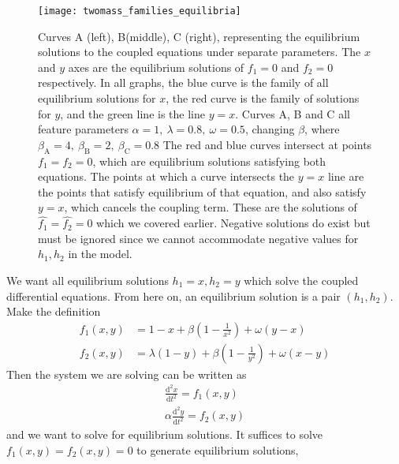 \documentclass{article}
\begin{document}
\begin{figure}
    \centering
    \texttt{[image: twomass\_families\_equilibria]}
    \caption{
        Curves A (left), B(middle), C (right), representing the equilibrium solutions to the coupled equations under separate parameters.
        The $x$ and $y$ axes are the equilibrium solutions of $f_1 = 0$ and $f_2=0$ respectively. 
        In all graphs, the blue curve is the family of all equilibrium solutions for $x$,
        the red curve is the family of solutions for $y$,
        and the green line is the line $y=x$.
        Curves A, B and C all feature parameters \(\alpha = 1,~\lambda=0.8,~\omega = 0.5\), changing $\beta$,
        where \(\beta_\mathrm{A} = 4,~\beta_\mathrm{B} = 2,~\beta_\mathrm{C} = 0.8\)
        The red and blue curves intersect at points $f_1=f_2=0$,
        which are equilibrium solutions satisfying both equations.
        The points at which a curve intersects the $y=x$ line are the points that satisfy equilibrium of that equation, and also satisfy $y=x$,
        which cancels the coupling term.
        These are the solutions of $\hat{f_1}=\hat{f_2}=0$ which we covered earlier.
        Negative solutions do exist but must be ignored since we cannot accommodate negative values for $h_1, h_2$ in the model.
    }
    \label{fig:twomass_equilibrium_curves}
\end{figure}
We want all equilibrium solutions \(h_1 = x, h_2 = y\) which solve the coupled differential equations.
From here on, an equilibrium solution is a pair \((h_1,h_2)\).
Make the definition
\begin{equation}
    \begin{aligned}
        f_1(x,y) &= 1-x + \beta\left(1 - \frac{1}{x^2}\right) + \omega(y-x) \\
        f_2(x,y) &= \lambda(1-y) + \beta\left(1 - \frac{1}{y^2}\right) + \omega(x-y)
        \label{eqn:twomass_equilibrium_functions}
    \end{aligned}
\end{equation}
Then the system we are solving can be written as
\begin{equation}
    \begin{aligned}
        \frac{\mathrm{d}^2x}{\mathrm{d}t^2} = f_1(x,y) \\
        \alpha\frac{\mathrm{d}^2y}{\mathrm{d}t^2} = f_2(x,y)
        \label{eqn:twomass_slave}  
    \end{aligned}
\end{equation}
and we want to solve for equilibrium solutions. It suffices to solve \(f_1(x,y) = f_2(x,y) = 0\) to generate equilibrium solutions,
\end{document}
